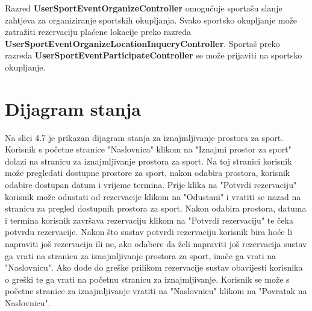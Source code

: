 		Razred \textbf{UserSportEventOrganizeController} omogućuje sportašu slanje zahtjeva za organiziranje sportskih okupljanja. Svako sportsko okupljanje može zatražiti rezervaciju plaćene lokacije preko razreda \textbf{UserSportEventOrganizeLocationInqueryController}. Sportaš preko razreda \textbf{UserSportEventParticipateController} se može prijaviti na sportsko okupljanje.
	
			
			
%			
%			
			
			
			
			\eject
		
		\section{Dijagram stanja}
			Na slici 4.7 je prikazan dijagram stanja za iznajmljivanje prostora za sport. Korisnik s početne stranice "Naslovnica" klikom na "Iznajmi prostor za sport" dolazi na stranicu za iznajmljivanje prostora za sport. Na toj stranici korisnik može pregledati dostupne prostore za sport, nakon odabira prostora, korisnik odabire dostupan datum i vrijeme termina. Prije klika na "Potvrdi rezervaciju" korisnik može odustati od rezervacije klikom na "Odustani" i vratiti se nazad na stranicu za pregled dostupnih prostora za sport. Nakon odabira prostora, datuma i termina korisnik završava rezervaciju klikom na "Potvrdi rezervaciju" te čeka potvrdu rezervacije. Nakon što sustav potvrdi rezervaciju korisnik bira hoće li napraviti još rezervacija ili ne, ako odabere da želi napraviti još rezervacija sustav ga vrati na stranicu za iznajmljivanje prostora za sport, inače ga vrati na "Naslovnicu". Ako dođe do greške prilikom rezervacije sustav obavijesti korisnika o greški te ga vrati na početnu stranicu za iznajmljivanje. Korisnik se može s početne stranice za iznajmljivanje vratiti na "Naslovnicu" klikom na "Povratak na Naslovnicu".
			
